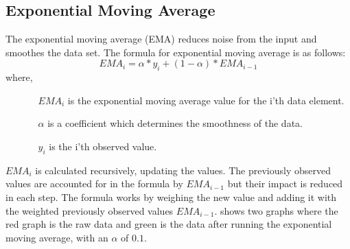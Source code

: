 \subsection{Exponential Moving Average}
\label{subsection:exponential-moving-average}
The exponential moving average (EMA) reduces noise from the input and smoothes the data set.
The formula for exponential moving average is as follows:
\begin{equation*}
	EMA_i = \alpha * y_i + (1-\alpha) * EMA_{i-1}
\end{equation*}
where,
\begin{itemize}
	\item[]
	\begin{itemize}
		\item[$EMA_i$] is the exponential moving average value for the i'th data element.
		\item[$\alpha$] is a coefficient which determines the smoothness of the data.
		\item[$y_i$] is the i'th observed value.
	\end{itemize}
\end{itemize}
$EMA_i$ is calculated recursively, updating the values. 
The previously observed values are accounted for in the formula by $EMA_{i-1}$ but their impact is reduced in each step.
The formula works by weighing the new value and adding it with the weighted previously observed values $EMA_{i-1}$.
 shows two graphs where the red graph is the raw data and green is the data after running the exponential moving average, with an $\alpha$ of $0.1$.

